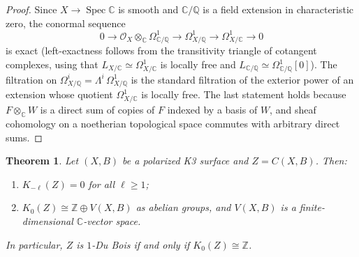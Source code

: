 \documentclass[11pt]{amsart}
\numberwithin{equation}{section}
\theoremstyle{plain}
\newtheorem{theorem}{Theorem}[section]
\theoremstyle{definition}
\theoremstyle{remark}
\newcommand{\CC}{\mathbb{C}}
\newcommand{\QQ}{\mathbb{Q}}
\newcommand{\ZZ}{\mathbb{Z}}
\newcommand{\cO}{\mathcal{O}}
\newcommand{\Spec}{\operatorname{Spec}}
\newcommand{\Kzero}{K_0}
\begin{document}
\begin{proof}
Since $X\to\Spec\CC$ is smooth and $\CC/\QQ$ is a field extension in characteristic zero, the conormal sequence
\[
0\to \cO_X\otimes_\CC\Omega^1_{\CC/\QQ}\to \Omega^1_{X/\QQ}\to\Omega^1_{X/\CC}\to0
\]
is exact (left-exactness follows from the transitivity triangle of cotangent complexes, using that $L_{X/\CC}\simeq\Omega^1_{X/\CC}$ is locally free and $L_{\CC/\QQ}\simeq\Omega^1_{\CC/\QQ}[0]$).
The filtration on $\Omega^i_{X/\QQ}=\Lambda^i\,\Omega^1_{X/\QQ}$ is the standard filtration of the exterior power of an extension whose quotient $\Omega^1_{X/\CC}$ is locally free.
The last statement holds because $F\otimes_\CC W$ is a direct sum of copies of $F$ indexed by a basis of $W$, and sheaf cohomology on a noetherian topological space commutes with arbitrary direct sums.
\end{proof}

\begin{theorem}\label{thm:K}
Let $(X,B)$ be a polarized K3 surface and $Z=C(X,B)$. Then:
\begin{enumerate}
\item $K_{-\ell}(Z)=0$ for all $\ell\ge1$;
\item $\Kzero(Z)\cong\ZZ\oplus V(X,B)$ as abelian groups, and $V(X,B)$ is a finite-dimensional $\CC$-vector space.
\end{enumerate}
In particular, $Z$ is $1$-Du Bois if and only if $\Kzero(Z)\cong\ZZ$.
\end{theorem}
\end{document}

